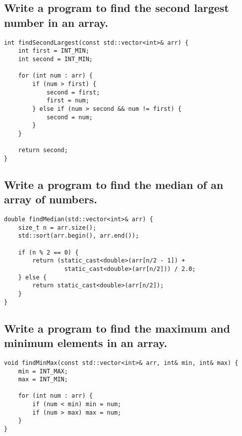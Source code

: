 \subsection{Write a program to find the second largest number in an array.}
\begin{tcolorbox}[title=]
\begin{verbatim}
int findSecondLargest(const std::vector<int>& arr) {
    int first = INT_MIN;
    int second = INT_MIN;

    for (int num : arr) {
        if (num > first) {
            second = first;
            first = num;
        } else if (num > second && num != first) {
            second = num;
        }
    }

    return second;
}
\end{verbatim}
\end{tcolorbox}

\subsection{Write a program to find the median of an array of numbers.}
\begin{tcolorbox}[title=]
\begin{verbatim}
double findMedian(std::vector<int>& arr) {
    size_t n = arr.size();
    std::sort(arr.begin(), arr.end());

    if (n % 2 == 0) {
        return (static_cast<double>(arr[n/2 - 1]) +
                 static_cast<double>(arr[n/2])) / 2.0;
    } else {
        return static_cast<double>(arr[n/2]);
    }
}    
\end{verbatim}
\end{tcolorbox}

\subsection{Write a program to find the maximum and minimum elements in an array.}
\begin{tcolorbox}[title=]
\begin{verbatim}
void findMinMax(const std::vector<int>& arr, int& min, int& max) {
    min = INT_MAX;
    max = INT_MIN;

    for (int num : arr) {
        if (num < min) min = num;
        if (num > max) max = num;
    }
}
\end{verbatim}
\end{tcolorbox}
